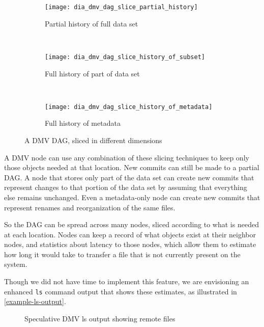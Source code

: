 \newcommand{\slicediagramwidth}{0.45\textwidth}

\begin{figure}

    \centering

    \begin{subfigure}[]{\slicediagramwidth}
        \texttt{[image: dia\_dmv\_dag\_slice\_partial\_history]}
        \caption{Partial history of full data set}
        \label{dia_dmv_dag_slice_partial_history}
    \end{subfigure}
    ~
    \begin{subfigure}[]{\slicediagramwidth}
        \texttt{[image: dia\_dmv\_dag\_slice\_history\_of\_subset]}
        \caption{Full history of part of data set}
        \label{dia_dmv_dag_slice_history_of_subset}
    \end{subfigure}
    ~
    \begin{subfigure}[]{\slicediagramwidth}
        \texttt{[image: dia\_dmv\_dag\_slice\_history\_of\_metadata]}
        \caption{Full history of metadata}
        \label{dia_dmv_dag_slice_history_of_metadata}
    \end{subfigure}

    \caption{A DMV DAG, sliced in different dimensions}
\end{figure}

A DMV node can use any combination of these slicing techniques to keep only
those objects needed at that location. New \glspl{commit} can still be made to a
partial DAG. A node that stores only part of the data set can create new
\glspl{commit} that represent changes to that portion of the data set by
assuming that everything else remains unchanged. Even a metadata-only node can
create new \glspl{commit} that represent renames and reorganization of the same
files.

So the DAG can be spread across many nodes, sliced according to what is needed
at each location. Nodes can keep a record of what objects exist at their
neighbor nodes, and statistics about latency to those nodes, which allow them to
estimate how long it would take to transfer a file that is not currently present
on the system.

Though we did not have time to implement this feature, we are envisioning an
enhanced \lstinline{ls} command output that shows these estimates, as
illustrated in \autoref{example-ls-output}.

\begin{figure}[]
    \caption{Speculative DMV ls output showing remote files}
    \label{example-ls-output}
    
\end{figure}


%
